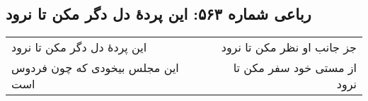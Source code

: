 \begin{center}
\section*{رباعی شماره ۵۶۳: این پردهٔ دل دگر مکن تا نرود}
\label{sec:0563}
\begin{longtable}{l p{0.5cm} r}
این پردهٔ دل دگر مکن تا نرود
&&
جز جانب او نظر مکن تا نرود
\\
این مجلس بیخودی که چون فردوس است
&&
از مستی خود سفر مکن تا نرود
\\
\end{longtable}
\end{center}
